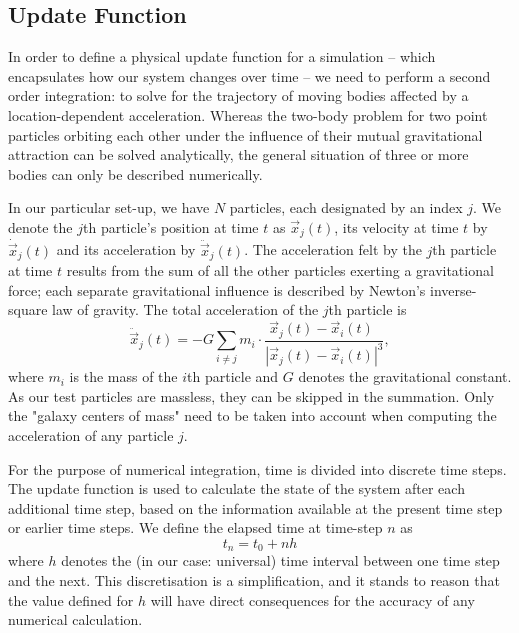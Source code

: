 \documentclass[11pt,twocolumn]{article}
\begin{document}
        \subsection{Update Function}
        
        In order to define a physical update function for a simulation -- which encapsulates how our system changes over time -- we need to perform a second order integration: to solve for the trajectory of moving bodies affected by a location-dependent acceleration. Whereas the two-body problem for two point particles orbiting each other under the influence of their mutual gravitational attraction can be solved analytically, the general situation of three or more bodies can only be described numerically.
        
 
In our particular set-up, we have $N$ particles, each designated by an index $j$. We denote the $j$th particle's position at time $t$ as $\vec{x}_j(t)$, its velocity at time $t$ by $\dot{\vec{x}}_j(t)$ and its acceleration by $\ddot{\vec{x}}_j(t)$. The acceleration felt by the $j$th particle at time $t$ results from the sum of all the other particles exerting a gravitational force; each separate gravitational influence is described by Newton's inverse-square law of gravity. The total acceleration of the $j$th particle is 
        \begin{equation}
                \ddot{\vec{x}}_j(t) =- G\sum_{i \neq j} m_i\cdot  \frac{\vec{x}_{j}(t) - \vec{x}_{i}(t)\phantom{{}^3}}{|\vec{x}_{j}(t) - \vec{x}_i(t)|^3},
                \label{GravitationalAcceleration}
        \end{equation}
 where $m_i$ is the mass of the $i$th particle and $G$ denotes the gravitational constant. As our test particles are massless, they can be skipped in the summation. Only the "galaxy centers of mass" need to be taken into account when computing the acceleration of any particle $j$.
 
For the purpose of numerical integration, time is divided into discrete time steps. The update function is used to calculate the state of the system after each additional time step, based on the information available at the present time step or earlier time steps. We define the elapsed time at time-step $n$ as
         \begin{equation}
         t_n = t_0 + n h
         \end{equation}
where $h$ denotes the (in our case: universal) time interval between one time step and the next. This discretisation is a simplification, and it stands to 
reason that the value defined for $h$ will have direct consequences for the accuracy of any numerical calculation.
        
\end{document}
